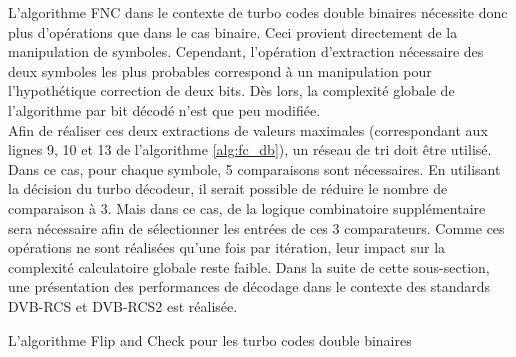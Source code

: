 L'algorithme FNC dans le contexte de turbo codes double binaires nécessite donc plus d'opérations que dans le cas binaire.
Ceci provient directement de la manipulation de symboles. Cependant, l'opération d'extraction nécessaire des deux symboles 
les plus probables correspond à un manipulation pour l'hypothétique correction de deux bits. Dès lors, la complexité globale
de l'algorithme par bit décodé n'est que peu modifiée.\\
Afin de réaliser ces deux extractions de valeurs maximales (correspondant aux lignes 9, 10 et 13 de l'algorithme 
\ref{alg:fc_db}), un réseau de tri doit être utilisé. Dans ce cas, pour chaque symbole, 5 comparaisons sont nécessaires.
En utilisant la décision du turbo décodeur, il serait possible de réduire le nombre de comparaison à 3. Mais dans ce cas,
de la logique combinatoire supplémentaire sera nécessaire afin de sélectionner les entrées de ces 3 comparateurs. Comme ces opérations
ne sont réalisées qu'une fois par itération, leur impact sur la complexité calculatoire globale reste faible. Dans la suite de 
cette sous-section, une présentation
des performances de décodage dans le contexte des standards DVB-RCS et DVB-RCS2 est réalisée.
\begin{center}
\begin{minipage}{.95\textwidth}%
\begin{algorithm}[H]
\label{alg:fc_db}
	\DontPrintSemicolon
	
	\;
	\caption{L'algorithme Flip and Check pour les turbo codes double binaires}
\end{algorithm}
\end{minipage}
\end{center}


